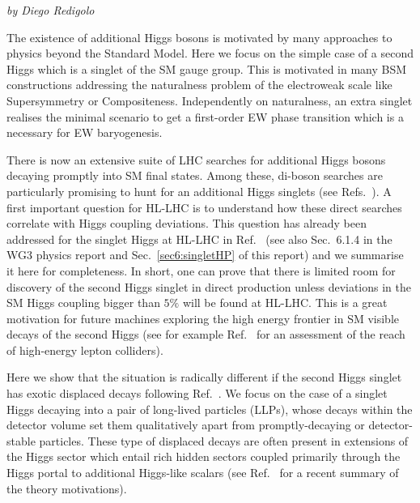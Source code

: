 \begin{center}
{\it by Diego Redigolo}
\end{center}

The existence of additional Higgs bosons is motivated by many
approaches to physics beyond the Standard Model. Here we focus on the simple case of a second Higgs which is a singlet of the SM gauge group. This is motivated in many BSM constructions addressing the naturalness problem of the electroweak scale like Supersymmetry or Compositeness. Independently on naturalness, an extra singlet realises the minimal scenario to get a first-order EW phase transition which is a necessary for EW baryogenesis. 

There is now an extensive suite of LHC searches for additional Higgs bosons decaying promptly into SM
final states. Among these, di-boson searches are particularly promising to hunt for an additional Higgs singlets (see Refs.~\cite{Sirunyan:2018qlb,Aaboud:2018knk,Sirunyan:2017isc,ATLAS:2017spa}). A first important question for HL-LHC is to understand how these direct searches correlate with Higgs coupling deviations. This question has already been addressed for the singlet Higgs at HL-LHC in Ref.~\cite{Buttazzo:2015bka} (see also Sec.~6.1.4 in the WG3 physics report \cite{CidVidal:2018eel} and Sec.~\ref{sec6:singletHP} of this report) and we summarise it here for completeness. In short, one can prove that there is limited room for discovery of the second Higgs singlet in direct production unless deviations in the SM Higgs coupling bigger than $5\%$ will be found at HL-LHC. This is a great motivation for future machines exploring the high energy frontier in SM visible decays of the second Higgs (see for example Ref.~\cite{Buttazzo:2018qqp} for an assessment of the reach of high-energy lepton colliders). 

Here we show that the situation is radically different if the second Higgs singlet has exotic displaced decays following Ref.~\cite{Alipour-fard:2018mre}. We focus on the case of a singlet Higgs decaying into a pair of long-lived particles (LLPs), whose decays within the detector volume set them qualitatively apart from promptly-decaying or detector-stable
particles. These type of displaced decays are often present in extensions of the Higgs sector which entail rich hidden sectors coupled primarily through the Higgs portal to additional Higgs-like scalars (see Ref.~\cite{Curtin:2018mvb} for a recent summary of the theory motivations).  

